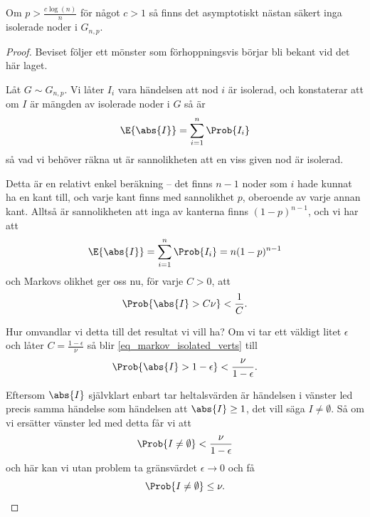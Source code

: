 \documentclass[nobib]{tufte-handout}
\begin{document}
\begin{proposition}
    Om $p > \frac{c\log(n)}{n}$ för något $c > 1$ så finns det asymptotiskt nästan säkert inga isolerade noder i $G_{n,p}$.

    \begin{proof}
        Beviset följer ett mönster som förhoppningsvis börjar bli bekant vid det här laget.

        Låt $G \sim G_{n,p}$. Vi låter $I_i$ vara händelsen att nod $i$ är isolerad, och konstaterar att om $I$ är mängden av isolerade noder i $G$ så är
        $$\E{\abs{I}} = \sum_{i=1}^{n} \Prob{I_i}$$
        så vad vi behöver räkna ut är sannolikheten att en viss given nod är isolerad.

        Detta är en relativt enkel beräkning -- det finns $n-1$ noder som $i$ hade kunnat ha en kant till, och varje kant finns med sannolikhet $p$, oberoende av varje annan kant. Alltså är sannolikheten att inga av kanterna finns $(1-p)^{n-1}$, och vi har att
        $$\E{\abs{I}} = \sum_{i=1}^{n} \Prob{I_i} = n(1-p)^{n-1}$$
        och Markovs olikhet ger oss nu, för varje $C > 0$, att
        \begin{equation}\label{eq_markov_isolated_verts}
            \Prob{\abs{I} > C\nu} < \frac{1}{C}.
        \end{equation}

        Hur omvandlar vi detta till det resultat vi vill ha? Om vi tar ett väldigt litet $\epsilon$ och låter $C = \frac{1 - \epsilon}{\nu}$ så blir \eqref{eq_markov_isolated_verts} till
        $$\Prob{\abs{I} > 1 - \epsilon} < \frac{\nu}{1 - \epsilon}.$$

        Eftersom $\abs{I}$ självklart enbart tar heltalsvärden är händelsen i vänster led precis samma händelse som händelsen att $\abs{I} \geq 1$, det vill säga $I \neq \emptyset$. Så om vi ersätter vänster led med detta får vi att
        $$\Prob{I \neq \emptyset} < \frac{\nu}{1-\epsilon}$$
        och här kan vi utan problem ta gränsvärdet $\epsilon \to 0$ och få
        $$\Prob{I \neq \emptyset} \leq \nu.$$


\end{proof}
\end{proposition}
\end{document}
